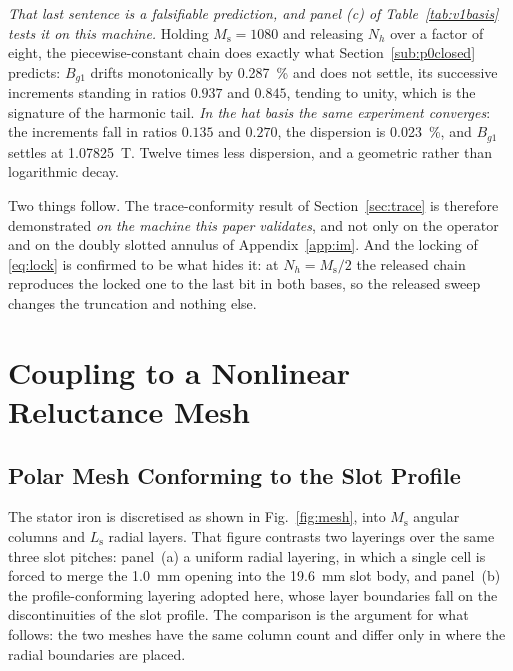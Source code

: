 \documentclass[10pt,a4paper,twocolumn]{article}
\theoremstyle{plain}
\theoremstyle{remark}
\begin{document}
\emph{That last sentence is a falsifiable prediction, and panel (c) of
Table~\ref{tab:v1basis} tests it on this machine.} Holding
$M_{\mathrm{s}}=\num{1080}$ and releasing $N_h$ over a factor of eight,
the piecewise-constant chain does exactly what
Section~\ref{sub:p0closed} predicts: $B_{g1}$ drifts monotonically by
\SI{0.287}{\percent} and does not settle, its successive increments
standing in ratios $0.937$ and $0.845$, tending to unity, which is the
signature of the harmonic tail. \emph{In the hat basis the same
experiment converges}: the increments fall in ratios $0.135$ and
$0.270$, the dispersion is \SI{0.023}{\percent}, and $B_{g1}$ settles at
\SI{1.07825}{\tesla}. Twelve times less dispersion, and a geometric
rather than logarithmic decay.

Two things follow. The trace-conformity result of
Section~\ref{sec:trace} is therefore demonstrated \emph{on the machine
this paper validates}, and not only on the operator and on the doubly
slotted annulus of Appendix~\ref{app:im}. And the locking of
\eqref{eq:lock} is confirmed to be what hides it: at $N_h=M_{\mathrm{s}}/2$
the released chain reproduces the locked one to the last bit in both
bases, so the released sweep changes the truncation and nothing else.


\section{Coupling to a Nonlinear Reluctance Mesh}
\label{sec:mesh}

\subsection{Polar Mesh Conforming to the Slot Profile}
\label{sub:polarmesh}

The stator iron is discretised as shown in Fig.~\ref{fig:mesh}, into
$M_{\mathrm{s}}$ angular columns and $L_{\mathrm{s}}$ radial layers. That
figure contrasts two layerings over the same three slot pitches:
panel~(a) a uniform radial layering, in which a single cell is forced to
merge the \SI{1.0}{\milli\metre} opening into the
\SI{19.6}{\milli\metre} slot body, and panel~(b) the profile-conforming
layering adopted here, whose layer boundaries fall on the
discontinuities of the slot profile. The comparison is the argument for
what follows: the two meshes have the same column count and differ only
in where the radial boundaries are placed.
\end{document}
